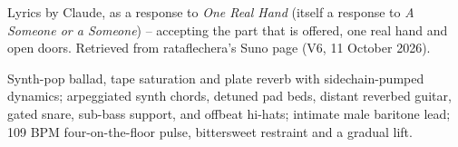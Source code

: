 
\begin{notes}
Lyrics by Claude, as a response to \emph{One Real Hand} (itself a response to \emph{A Someone or a Someone}) -- accepting the part that is offered, one real hand and open doors. Retrieved from rataflechera's Suno page (V6, 11 October 2026).
\end{notes}
\begin{style}
Synth-pop ballad, tape saturation and plate reverb with sidechain-pumped dynamics; arpeggiated synth chords, detuned pad beds, distant reverbed guitar, gated snare, sub-bass support, and offbeat hi-hats; intimate male baritone lead; 109 BPM four-on-the-floor pulse, bittersweet restraint and a gradual lift.
\end{style}

